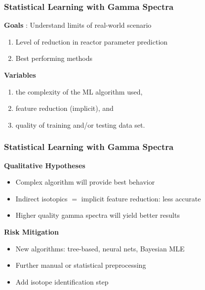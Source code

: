 
\begin{frame}
  \frametitle{Statistical Learning with Gamma Spectra}
  \textbf{Goals} : Understand limits of real-world scenario
  \begin{enumerate}
    \item Level of reduction in reactor parameter prediction
    \item Best performing methods
  \end{enumerate}

  \textbf{Variables}
  \begin{enumerate}
    \item the complexity of the ML algorithm used, 
    \item feature reduction (implicit), and 
    \item quality of training and/or testing data set.
  \end{enumerate}
\end{frame}

\begin{frame}
  \frametitle{Statistical Learning with Gamma Spectra}
  \textbf{Qualitative Hypotheses}
  \begin{itemize}
    \item Complex algorithm will provide best behavior
    \item Indirect isotopics $=$ implicit feature reduction: less accurate
    \item Higher quality gamma spectra will yield better results
  \end{itemize}

  \textbf{Risk Mitigation}
  \begin{itemize}
    \item New algorithms: tree-based, neural nets, Bayesian MLE
    \item Further manual or statistical preprocessing
    \item Add isotope identification step
  \end{itemize}
\end{frame}


